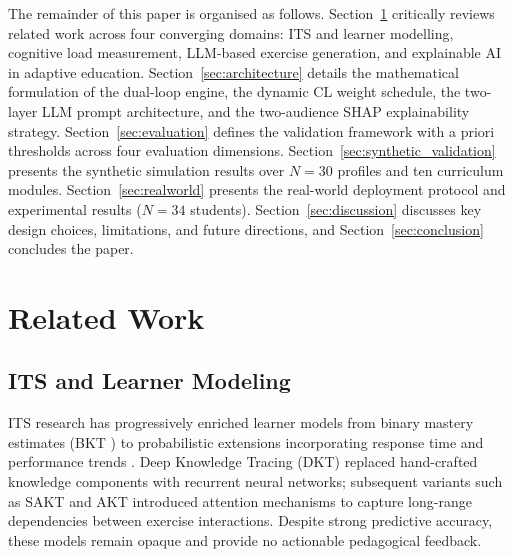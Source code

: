 \documentclass[ASNA,twocolumn]{USG} %
\begin{document}
The remainder of this paper is organised as follows.
Section~\ref{sec:background} critically reviews related
work across four converging domains: ITS and learner
modelling, cognitive load measurement, LLM-based exercise
generation, and explainable AI in adaptive education.
Section~\ref{sec:architecture} details the mathematical
formulation of the dual-loop engine, the dynamic CL
weight schedule, the two-layer LLM prompt architecture,
and the two-audience SHAP explainability strategy.
Section~\ref{sec:evaluation} defines the validation
framework with a priori thresholds across four
evaluation dimensions.
Section~\ref{sec:synthetic_validation} presents the
synthetic simulation results over $N{=}30$ profiles and
ten curriculum modules.
Section~\ref{sec:realworld} presents the real-world
deployment protocol and experimental results
($N{=}34$ students).
Section~\ref{sec:discussion} discusses key design
choices, limitations, and future directions, and
Section~\ref{sec:conclusion} concludes the paper.
\section{Related Work}
\label{sec:background}

\subsection{ITS and Learner Modeling}

ITS research has progressively enriched learner models from binary
mastery estimates (BKT \cite{Corbett1995}) to probabilistic extensions
incorporating response time and performance trends \cite{Cai2022}.
Deep Knowledge Tracing (DKT) \cite{Piech2015} replaced hand-crafted
knowledge components with recurrent neural networks; subsequent
variants such as SAKT \cite{Pandey2019} and AKT
\cite{Ghosh2020} introduced attention mechanisms to capture
long-range dependencies between exercise interactions.
Despite strong predictive accuracy, these models remain opaque
and provide no actionable pedagogical feedback.
\end{document}
